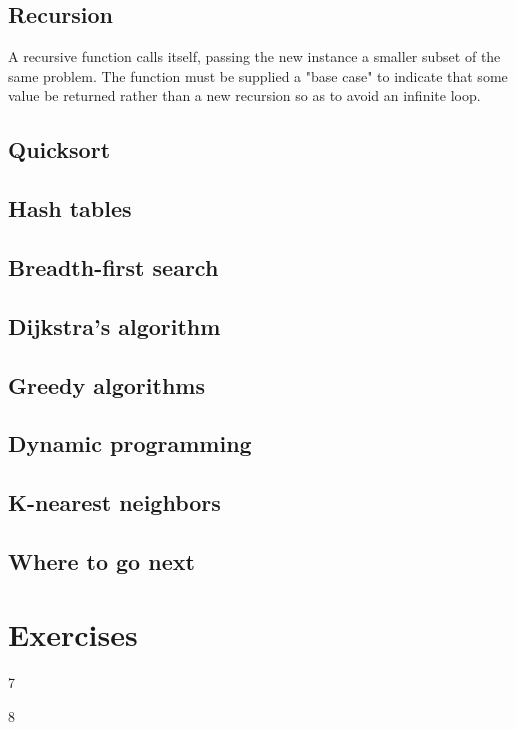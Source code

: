 \subsection{Recursion}
A recursive function calls itself, passing the new instance a smaller subset of the same problem. The function must be supplied a "base case" to indicate that some value be returned rather than a new recursion so as to avoid an infinite loop.
\subsection{Quicksort}
\subsection{Hash tables}
\subsection{Breadth-first search}
\subsection{Dijkstra's algorithm}
\subsection{Greedy algorithms}
\subsection{Dynamic programming}
\subsection{K-nearest neighbors}
\subsection{Where to go next}

\onecolumn
\section{Exercises}

\begin{problem}{1.1}
\end{problem}
\begin{solution}
7
\end{solution}

\begin{problem}{1.2}
\end{problem}
\begin{solution}
8
\end{solution}

